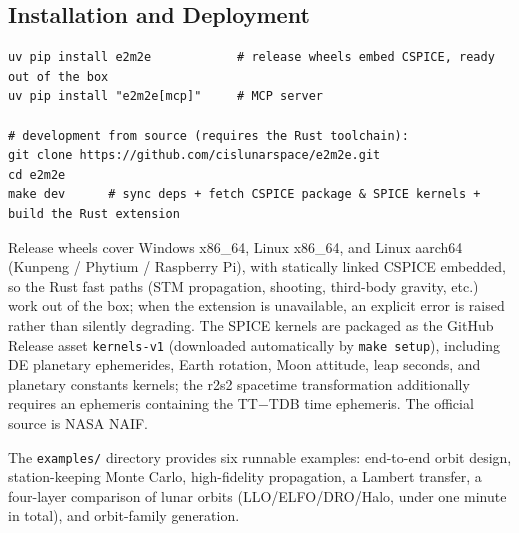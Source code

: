 \subsection{Installation and Deployment}

\begin{lstlisting}[style=e2bash,caption={Installation and SPICE kernel setup},label=lst:install]
uv pip install e2m2e            # release wheels embed CSPICE, ready out of the box
uv pip install "e2m2e[mcp]"     # MCP server

# development from source (requires the Rust toolchain):
git clone https://github.com/cislunarspace/e2m2e.git
cd e2m2e
make dev      # sync deps + fetch CSPICE package & SPICE kernels + build the Rust extension
\end{lstlisting}

Release wheels cover Windows x86\_64, Linux x86\_64, and Linux aarch64
(Kunpeng / Phytium / Raspberry Pi), with statically linked CSPICE embedded,
so the Rust fast paths (STM propagation, shooting, third-body gravity, etc.)
work out of the box; when the extension is unavailable, an explicit error is
raised rather than silently degrading. The SPICE kernels are packaged as the
GitHub Release asset \texttt{kernels-v1} (downloaded automatically by
\texttt{make setup}), including DE planetary ephemerides, Earth rotation,
Moon attitude, leap seconds, and planetary constants kernels; the r2s2
spacetime transformation additionally requires an ephemeris containing the
TT$-$TDB time ephemeris. The official source is NASA NAIF.

The \texttt{examples/} directory provides six runnable examples: end-to-end
orbit design, station-keeping Monte Carlo, high-fidelity propagation, a
Lambert transfer, a four-layer comparison of lunar orbits (LLO/ELFO/DRO/Halo,
under one minute in total), and orbit-family generation.
